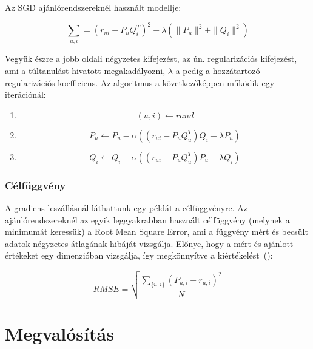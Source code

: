 \documentclass[a4paper,12pt]{article}
\begin{document}
Az SGD ajánlórendszereknél használt modellje:

\[\sum\limits_{u,i} = (r_{ui}-P_{u}Q_{i}^T)^2 + \lambda (\parallel P_{u}\parallel^2 +\parallel Q_{i}\parallel^2)\]
\[\]

Vegyük észre a jobb oldali négyzetes kifejezést, az ún. regularizációs kifejezést, ami a túltanulást hivatott megakadályozni, $\lambda$ a pedig a hozzátartozó regularizációs koefficiens. Az algoritmus a következőképpen működik egy iterációnál: 

\begin{enumerate}
\item \[(u, i) \leftarrow rand \]
\item \[P_{u} \leftarrow P_{u} - \alpha((r_{ui}-P_{u}Q_{u}^T)Q_{i} - \lambda P_{u})\]
\item \[Q_{i} \leftarrow Q_{i} - \alpha((r_{ui}-P_{u}Q_{u}^T)P_{u} - \lambda Q_{i})\]
\end{enumerate}

\subsubsection{Célfüggvény}
A gradiens leszállásnál láthattunk egy példát a célfüggvényre. Az ajánlórendszereknél az egyik leggyakrabban használt célfüggvény (melynek a minimumát keressük) a Root Mean Square Error, ami a függvény mért és becsült adatok négyzetes átlagának hibáját vizsgálja. Előnye, hogy a mért és ajánlott értékeket egy dimenzióban vizsgálja, így megkönnyítve a kiértékelést~(\cite{vikas}):  

\[RMSE =   \sqrt{\frac{ \sum_{\{u,i\}} (P_{u,i} - r_{u,i})^2}{N}}\] 
\newpage

\section{Megvalósítás}
\end{document}
